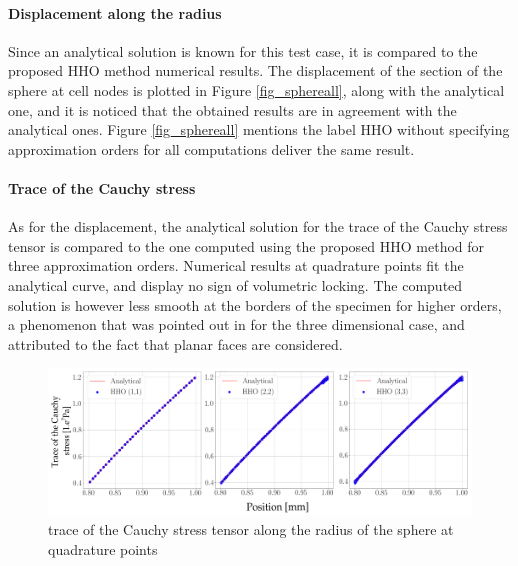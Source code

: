 \paragraph{Displacement along the radius}

Since an analytical solution is known for this test case, it is compared to the proposed HHO method numerical results. The displacement of the section of the sphere at cell nodes
is plotted in Figure \ref{fig_sphereall}, along with the analytical one, and it is noticed that the obtained results are in agreement with the analytical ones.
Figure \ref{fig_sphereall} mentions the label HHO without specifying approximation orders for all computations deliver the same result.

\paragraph{Trace of the Cauchy stress}

As for the displacement, the analytical solution for the trace of the Cauchy stress tensor is compared to the one computed using the proposed HHO method for three approximation orders.
Numerical results at quadrature points fit the analytical curve, and display no sign of volumetric locking. The computed solution is however less smooth
at the borders of the specimen for higher orders, a phenomenon that was pointed out in \cite{abbas_hybrid_2019-1} for the three dimensional case, and attributed to the fact that planar faces are considered.

\begin{figure}[H]
    \centering
    \includegraphics[width=15.cm]{../chapter_01_hho_mechanics/figures/sphere_pressures.png}
    \caption{trace of the Cauchy stress tensor along the radius of the sphere at quadrature points}
    \label{fig_sphere_pressure}
\end{figure}

